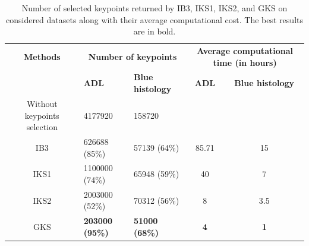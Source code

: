 \begin{table}
\renewcommand{\arraystretch}{1.5}
\centering
\footnotesize
\caption[Number of selected keypoints returned by IB3, IKS1, IKS2, and GKS on considered datasets along with their average computational cost]{\fontsize{10}{12}\selectfont Number of selected keypoints returned by IB3, IKS1, IKS2, and GKS on considered datasets along with their average computational cost. The best results are in bold.}
\begin{tabular}{cll|cc}
    \hline
    
\textbf{Methods}    & \multicolumn{2}{c}{ \textbf{Number of keypoints}} &  \multicolumn{2}{|c}{\textbf{Average computational time (in hours)}}   \\
\cline{2-5}
&\textbf{ADL}&\textbf{Blue histology}&\textbf{ADL}&\textbf{Blue histology}\\
\hline
Without keypoints selection        &    4177920    &    158720    \\
IB3 &  626688 (85\%) & 57139 (64\%) &85.71 & 15\\ 
IKS1        &    1100000 (74\%)    &    65948 (59\%)  & 40& 7    \\
IKS2        &    2003000 (52\%) &    70312 (56\%)     & 8 &3.5\\    
GKS        &    \textbf{203000 (95\%)}     &\textbf{51000 (68\%)}    &  \textbf{4} &\textbf{1}    \\
\hline
\end{tabular}
\label{ch3:tab:selectK}
\end{table}


